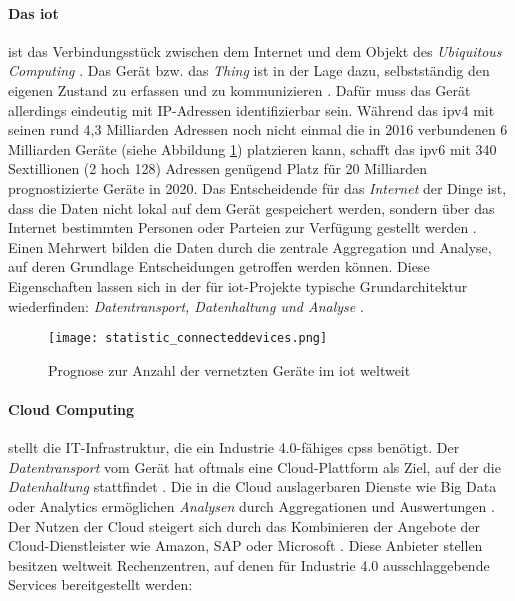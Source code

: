 \paragraph{Das \acf{iot}} ist das Verbindungsstück zwischen dem Internet und dem Objekt des \textit{Ubiquitous Computing} \citep{Roth2016}. Das Gerät bzw. das \textit{Thing} ist in der Lage dazu, selbstständig den eigenen Zustand zu erfassen und zu kommunizieren \citep{Kenn2016}. Dafür muss das Gerät allerdings eindeutig mit IP-Adressen identifizierbar sein. Während das \acf{ipv4} mit seinen rund 4,3 Milliarden Adressen noch nicht einmal die in 2016 verbundenen 6 Milliarden Geräte (siehe Abbildung \ref{fig:connecteddevices}) platzieren kann, schafft das \ac{ipv6} mit 340 Sextillionen (2 hoch 128) Adressen genügend Platz für 20 Milliarden prognostizierte Geräte in 2020. Das Entscheidende für das \textit{Internet} der Dinge ist, dass die Daten nicht lokal auf dem Gerät gespeichert werden, sondern über das Internet bestimmten Personen oder Parteien zur Verfügung gestellt werden \citep{Hanisch2017}. Einen Mehrwert bilden die Daten durch die zentrale Aggregation und Analyse, auf deren Grundlage Entscheidungen getroffen werden können. Diese Eigenschaften lassen sich in der für \ac{iot}-Projekte typische Grundarchitektur wiederfinden: \textit{Datentransport, Datenhaltung und Analyse} \citep{Kenn2016}.

\begin{figure}[ht]
  \centering
  \texttt{[image: statistic\_connecteddevices.png]}
  \caption[Prognose zur Anzahl der vernetzten Geräte im Internet of TThings weltweit]{Prognose zur Anzahl der vernetzten Geräte im \ac{iot} weltweit \citep{Gartner2017a}}\label{fig:connecteddevices}
\end{figure}

\paragraph{Cloud Computing} stellt die IT-Infrastruktur, die ein Industrie 4.0-fähiges \ac{cpss} benötigt. Der \textit{Datentransport} vom Gerät hat oftmals eine Cloud-Plattform als Ziel, auf der die \textit{Datenhaltung} stattfindet \citep{Elsner2018}. Die in die Cloud auslagerbaren Dienste wie Big Data oder Analytics ermöglichen \textit{Analysen} durch Aggregationen und Auswertungen \citep{Roth2016}. Der Nutzen der Cloud steigert sich durch das Kombinieren der Angebote der Cloud-Dienstleister wie Amazon, SAP oder Microsoft \citep{Hnisch2017}. Diese Anbieter stellen besitzen weltweit Rechenzentren, auf denen für Industrie 4.0 ausschlaggebende Services bereitgestellt werden:


